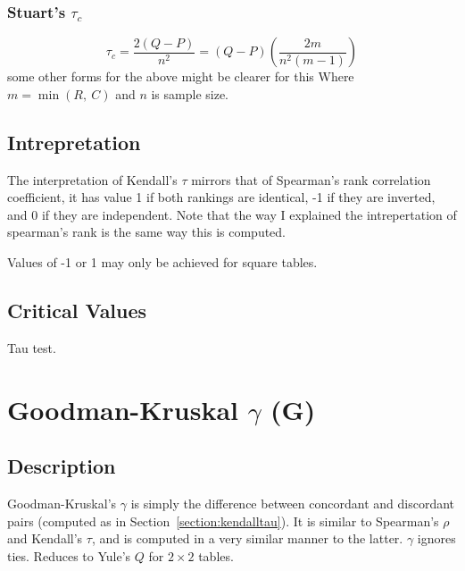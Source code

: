 \documentclass[11pt]{article}
\begin{document}
\subsubsection{Stuart's $\tau_c$}
$$
\tau_c = \frac{2(Q-P)}{n^2} = (Q-P) \left( \frac{ 2m }{n^2(m-1)} \right)
$$
{\color{red} some other forms for the above might be clearer for this}
Where $m = \min(R,~C)$ and $n$ is sample size.


\subsection{Intrepretation}
The interpretation of Kendall's $\tau$ mirrors that of Spearman's rank correlation coefficient, it has value 1 if both rankings are identical, -1 if they are inverted, and 0 if they are independent.  Note that the way I explained the intrepertation of spearman's rank is the same way this is computed.

Values of -1 or 1 may only be achieved for square tables.


\subsection{Critical Values}
Tau test.








\section{Goodman-Kruskal $\gamma$ (G)} %
\subsection{Description}
Goodman-Kruskal's $\gamma$ is simply the difference between concordant and discordant pairs (computed as in Section~\ref{section:kendalltau}).  It is similar to Spearman's $\rho$ and Kendall's $\tau$, and is computed in a very similar manner to the latter.  $\gamma$ ignores ties.  Reduces to Yule's $Q$ for $2 \times 2$ tables.
\end{document}

